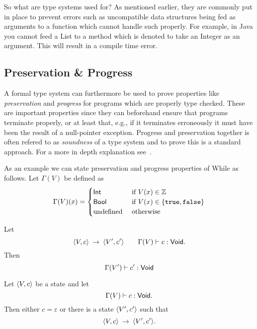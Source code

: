 So what are type systems used for? As mentioned earlier, they are commonly put
in place to prevent errors such as uncompatible data structures being fed as arguments
to a function which cannot handle such properly. For example, in Java you cannot feed a
List to a method which is denoted to take an Integer as an argument. This will
result in a compile time error.

\subsection{Preservation \& Progress}
\label{sub:preservation_&_progress}

A formal type system can furthermore be used to prove properties like
\emph{preservation} and \emph{progress} for programs which are properly type
checked. These are important properties since they can beforehand ensure that
programs terminate properly, or at least that, e.g., if it terminates erroneously it
must have been the result of a null-pointer exception. Progress and preservation
together is often refered to as \emph{soundness} of a type system and to prove this
is a standard approach. For a more in depth explanation
see~\parencite{pierce2002types}.

As an example we can state preservation and progress properties of While as follows. Let
$\Gamma(V)$ be defined as 
\[
  \Gamma(V)(x) = \begin{cases}
    \mbox{$\mathsf{Int}$} & \text{ if } V(x) \in \mathbb{Z} \\
    \mbox{$\mathsf{Bool}$} & \text{ if } V(x) \in \left\{\mbox{\texttt{true}}, \mbox{\texttt{false}} \right\} \\
    \text{undefined} & \text{ otherwise }
  \end{cases}
\]
\begin{proposition} 
  Let
  \begin{equation*}
    \langle V, c \rangle \: \rightarrow \: \langle V', c' \rangle \quad\quad \Gamma(V) \vdash
    c: \mbox{$\mathsf{Void}$}.
  \end{equation*}
  Then 
  \begin{equation*}
    \Gamma(V') \vdash c': \mbox{$\mathsf{Void}$}
  \end{equation*}
\end{proposition}
\begin{proposition}
  Let $\langle V, c \rangle$ be a state and let
  \begin{equation*}
    \Gamma(V) \vdash c: \mbox{$\mathsf{Void}$}.
  \end{equation*}
  Then either $c = \varepsilon$ or there is a state $\langle V', c' \rangle$ such that
  \begin{equation*}
    \langle V, c \rangle \: \rightarrow \: \langle V', c' \rangle.
  \end{equation*}
\end{proposition}


